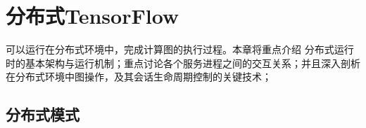 \begin{savequote}[45mm]
\end{savequote}

\chapter{分布式TensorFlow} 
\label{ch:distributed}

\begin{content}

\tf{}可以运行在分布式环境中，完成计算图的执行过程。本章将重点介绍 分布式运行时的基本架构与运行机制；重点讨论各个服务进程之间的交互关系；并且深入剖析在分布式环境中图操作，及其会话生命周期控制的关键技术；

\end{content}

\section{分布式模式}

